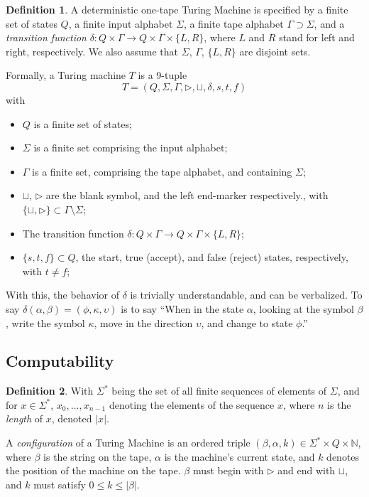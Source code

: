 \documentclass[11pt,letterpaper]{article}
\theoremstyle{definition}
\newtheorem{defn}{Definition}[section]
\begin{document}
\begin{defn}\label{def:turingm}
    A deterministic one-tape Turing Machine is specified by a finite set of states \(Q \), a finite input alphabet \(\Sigma \), a finite tape alphabet \(\Gamma \supset \Sigma \), and a \emph{transition function} \(\delta\colon Q\times\Gamma\to Q\times \Gamma\times \{L, R\} \), where \(L \) and \(R \) stand for left and right, respectively. We also assume that \(\Sigma \), \(\Gamma \), \( \{L, R\} \) are disjoint sets.\autocite{kleinberg_2012}\autocite{kleinberg_2013}

    Formally, a Turing machine \(T \) is a 9-tuple\autocite{kozen_1997}
    \[
        T = (Q, \Sigma, \Gamma, \triangleright,\sqcup,\delta,s,t,f)
    \]
    with
    \begin{itemize}
        \item \(Q \) is a finite set of states;
        \item \(\Sigma \) is a finite set comprising the input alphabet;
        \item \(\Gamma \) is a finite set, comprising the tape alphabet, and containing \(\Sigma \);
        \item \(\sqcup \), \(\triangleright \) are the blank symbol, and the left end-marker respectively., with \( \{\sqcup, \triangleright \}\subset\Gamma \setminus \Sigma \);
        \item The transition function \(\delta\colon Q\times\Gamma\to Q\times \Gamma\times \{L, R\} \);
        \item \( \{s,t,f\}\subset Q \), the start, true (accept), and false (reject) states, respectively, with \(t \neq f \);
    \end{itemize}
\end{defn}

With this, the behavior of \(\delta \) is trivially understandable, and can be verbalized. To say \(\delta(\alpha, \beta) = (\phi,\kappa,\upsilon) \) is to say ``When in the state \(\alpha \), looking at the symbol \(\beta \), write the symbol \(\kappa \), move in the direction \(\upsilon \), and change to state \(\phi \).''\autocite{sep-turing-machine}

\subsection{Computability}
\begin{defn}\label{def:config}
    With \(\Sigma^* \) being the set of all finite sequences of elements of \(\Sigma \), and for \(x\in\Sigma^* \), \(x_0,\ldots,x_{n-1} \) denoting the elements of the sequence \(x \), where \(n \) is the \emph{length} of \(x \), denoted \(|x| \).

    A \emph{configuration} of a Turing Machine is an ordered triple \((\beta, \alpha, k)\in\Sigma^*\times Q\times \mathbb N \), where \(\beta \) is the string on the tape, \(\alpha \) is the machine's current state, and \(k \) denotes the position of the machine on the tape. \(\beta \) must begin with \(\triangleright \) and end with \(\sqcup \), and \(k \) must satisfy \(0\leq k \leq |\beta| \).\autocite{kleinberg_2012}
\end{defn}
\end{document}

